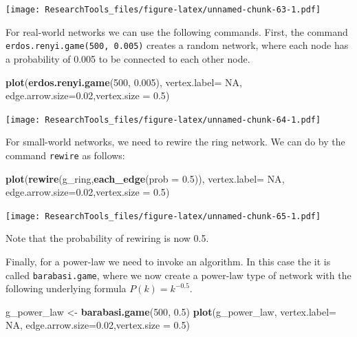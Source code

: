 \documentclass[]{article}
\newenvironment{Shaded}{\begin{snugshade}}{\end{snugshade}}
\newcommand{\KeywordTok}[1]{\textcolor[rgb]{0.13,0.29,0.53}{\textbf{#1}}}
\newcommand{\DataTypeTok}[1]{\textcolor[rgb]{0.13,0.29,0.53}{#1}}
\newcommand{\DecValTok}[1]{\textcolor[rgb]{0.00,0.00,0.81}{#1}}
\newcommand{\FloatTok}[1]{\textcolor[rgb]{0.00,0.00,0.81}{#1}}
\newcommand{\StringTok}[1]{\textcolor[rgb]{0.31,0.60,0.02}{#1}}
\newcommand{\OtherTok}[1]{\textcolor[rgb]{0.56,0.35,0.01}{#1}}
\newcommand{\NormalTok}[1]{#1}
\theoremstyle{definition}
\theoremstyle{definition}
\theoremstyle{definition}
\theoremstyle{remark}
\begin{document}
\texttt{[image: ResearchTools\_files/figure-latex/unnamed-chunk-63-1.pdf]}

For real-world networks we can use the following commands. First, the
command \texttt{erdos.renyi.game(500,\ 0.005)} creates a random network,
where each node has a probability of 0.005 to be connected to each other
node.

\begin{Shaded}
\begin{Highlighting}[]
\KeywordTok{plot}\NormalTok{(}\KeywordTok{erdos.renyi.game}\NormalTok{(}\DecValTok{500}\NormalTok{, }\FloatTok{0.005}\NormalTok{), }\DataTypeTok{vertex.label=} \OtherTok{NA}\NormalTok{, }\DataTypeTok{edge.arrow.size=}\FloatTok{0.02}\NormalTok{,}\DataTypeTok{vertex.size =} \FloatTok{0.5}\NormalTok{)}
\end{Highlighting}
\end{Shaded}

\texttt{[image: ResearchTools\_files/figure-latex/unnamed-chunk-64-1.pdf]}

For small-world networks, we need to rewire the ring network. We can do
by the command \texttt{rewire} as follows:

\begin{Shaded}
\begin{Highlighting}[]
\KeywordTok{plot}\NormalTok{(}\KeywordTok{rewire}\NormalTok{(g_ring,}\KeywordTok{each_edge}\NormalTok{(}\DataTypeTok{prob =} \FloatTok{0.5}\NormalTok{)), }\DataTypeTok{vertex.label=} \OtherTok{NA}\NormalTok{, }\DataTypeTok{edge.arrow.size=}\FloatTok{0.02}\NormalTok{,}\DataTypeTok{vertex.size =} \FloatTok{0.5}\NormalTok{)}
\end{Highlighting}
\end{Shaded}

\texttt{[image: ResearchTools\_files/figure-latex/unnamed-chunk-65-1.pdf]}

Note that the probability of rewiring is now 0.5.

Finally, for a power-law we need to invoke an algorithm. In this case
the it is called \texttt{barabasi.game}, where we now create a power-law
type of network with the following underlying formula
\(P(k) = k^{-0.5}\).

\begin{Shaded}
\begin{Highlighting}[]
\NormalTok{g_power_law <-}\StringTok{ }\KeywordTok{barabasi.game}\NormalTok{(}\DecValTok{500}\NormalTok{, }\FloatTok{0.5}\NormalTok{)}
\KeywordTok{plot}\NormalTok{(g_power_law, }\DataTypeTok{vertex.label=} \OtherTok{NA}\NormalTok{, }\DataTypeTok{edge.arrow.size=}\FloatTok{0.02}\NormalTok{,}\DataTypeTok{vertex.size =} \FloatTok{0.5}\NormalTok{)}
\end{Highlighting}
\end{Shaded}
\end{document}
